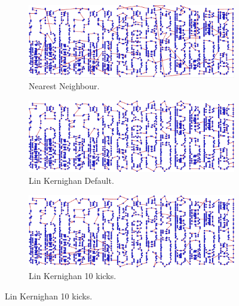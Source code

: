 \documentclass[13pt,a4paper]{article}
\begin{document}
\begin{figure}[b]
    \begin{subfigure}[t]{0.3\textwidth}
        \centering
        \includegraphics[width=\textwidth]{img/3/N.png}
        \caption{Nearest Neighbour.}
    \end{subfigure}
    \begin{subfigure}[t]{0.3\textwidth}
        \centering
        \includegraphics[width=\textwidth]{img/3/L1.png}
        \caption{Lin Kernighan Default.}
    \end{subfigure}
    \begin{subfigure}[t]{0.3\textwidth}
        \centering
        \includegraphics[width=\textwidth]{img/3/L10.png}
        \caption{Lin Kernighan 10 kicks.}
    \end{subfigure}


\end{figure}
\end{document}
